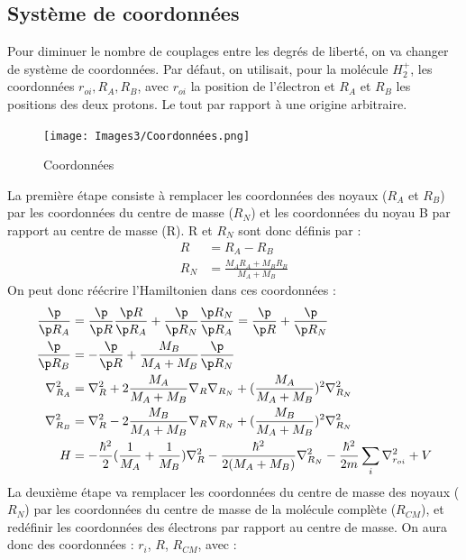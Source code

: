 \subsection{Système de coordonnées}

Pour diminuer le nombre de couplages entre les degrés de liberté, on va changer de système de coordonnées.\newline
Par défaut, on utilisait, pour la molécule $H^+_2$, les coordonnées $r_{oi}, R_A, R_B$, avec $r_{oi}$ la position de l'électron et $R_A$ et $R_B$ les positions des deux protons. Le tout par rapport à une origine arbitraire.\newline
 \begin{figure}[ht]
    \centering
    \texttt{[image: Images3/Coordonnées.png]}
    \caption{Coordonnées}
\end{figure}
La première étape consiste à remplacer les coordonnées des noyaux ($R_A$ et $R_B$) par les coordonnées du centre de masse ($R_N$) et les coordonnées du noyau B par rapport au centre de masse (R). R et $R_N$ sont donc définis par :
\begin{equation*}
    \begin{split}
        R &= R_A - R_B \\
        R_N &= \frac{M_AR_A + M_BR_B}{M_A+M_B}
    \end{split}
\end{equation*}
On peut donc réécrire l'Hamiltonien dans ces coordonnées :
\begin{equation*}
    \begin{split}
        \frac{\p}{\p R_A} &=  \frac{\p}{\p R}\frac{\p R}{\p R_A} + \frac{\p}{\p R_N}\frac{\p R_N}{\p R_A} = \frac{\p}{\p R} + \frac{\p}{\p R_N} \\
        \frac{\p}{\p R_B} &= -\frac{\p}{\p R} + \frac{M_B}{M_A+M_B}\frac{\p}{\p R_N} \\
        \nabla^2_{R_A} &= \nabla^2_{R} + 2\frac{M_A}{M_A+M_B}\nabla_{R}\nabla_{R_N} + (\frac{M_A}{M_A+M_B})^2\nabla^2_{R_N} \\
        \nabla^2_{R_B} &= \nabla^2_{R} - 2\frac{M_B}{M_A+M_B}\nabla_{R}\nabla_{R_N} + (\frac{M_B}{M_A+M_B})^2\nabla^2_{R_N} \\
        H &= -\frac{\hbar^2}{2}(\frac{1}{M_A}+\frac{1}{M_B})\nabla^2_{R} - \frac{\hbar^2}{2(M_A+M_B)}\nabla^2_{R_N} - \frac{\hbar^2}{2m}\sum\limits_i \nabla^2_{r_{oi}} +V
    \end{split}
\end{equation*}
La deuxième étape va remplacer les coordonnées du centre de masse des noyaux ($R_N$) par les coordonnées du centre de masse de la molécule complète ($R_{CM}$), et redéfinir les coordonnées des électrons par rapport au centre de masse. On aura donc des coordonnées : {$r_i$, $R$, $R_{CM}$}, avec :
